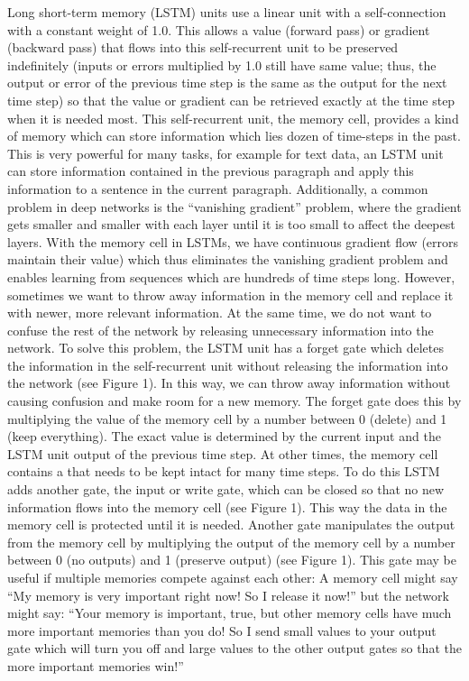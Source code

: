 Long short-term memory (LSTM) units use a linear unit with a self-connection with a constant weight of 1.0. This allows a value (forward pass) or gradient (backward pass) that flows into this self-recurrent unit to be preserved indefinitely (inputs or errors multiplied by 1.0 still have same value; thus, the output or error of the previous time step is the same as the output for the next time step) so that the value or gradient can be retrieved exactly at the time step when it is needed most. This self-recurrent unit, the memory cell, provides a kind of memory which can store information which lies dozen of time-steps in the past. This is very powerful for many tasks, for example for text data, an LSTM unit can store information contained in the previous paragraph and apply this information to a sentence in the current paragraph.
Additionally, a common problem in deep networks is the “vanishing gradient” problem, where the gradient gets smaller and smaller with each layer until it is too small to affect the deepest layers. With the memory cell in LSTMs, we have continuous gradient flow (errors maintain their value) which thus eliminates the vanishing gradient problem and enables learning from sequences which are hundreds of time steps long.
However, sometimes we want to throw away information in the memory cell and replace it with newer, more relevant information. At the same time, we do not want to confuse the rest of the network by releasing unnecessary information into the network. To solve this problem, the LSTM unit has a forget gate which deletes the information in the self-recurrent unit without releasing the information into the network (see Figure 1). In this way, we can throw away information without causing confusion and make room for a new memory. The forget gate does this by multiplying the value of the memory cell by a number between 0 (delete) and 1 (keep everything). The exact value is determined by the current input and the LSTM unit output of the previous time step.
At other times, the memory cell contains a   that needs to be kept intact for many time steps. To do this LSTM adds another gate, the input or write gate, which can be closed so that no new information flows into the memory cell (see Figure 1). This way the data in the memory cell is protected until it is needed.
Another gate manipulates the output from the memory cell by multiplying the output of the memory cell by a number between 0 (no outputs) and 1 (preserve output) (see Figure 1). This gate may be useful if multiple memories compete against each other: A memory cell might say “My memory is very important right now! So I release it now!” but the network might say: “Your memory is important, true, but other memory cells have much more important memories than you do! So I send small values to your output gate which will turn you off and large values to the other output gates so that the more important memories win!”
